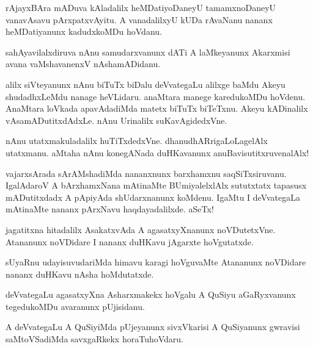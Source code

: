 \begin{mng}
rAjayxBAra mADuva kAladalilx heMDatiyoDaneyU tamamxnoDaneyU vanavAsavu pArxpatxvAyitu. A vanadalilxyU kUDa rAvaNanu nananx heMDatiyanunx kadudxkoMDu hoVdanu.
\end{mng}

\begin{mng}
sahAyavilalxdiruva nAnu samudarxvanunx dATi A laMkeyanunx Akarxmisi avana vaMshavanenxV nAshamADidanu.
\end{mng}

\begin{mng}
alilx siVteyanunx nAnu biTuTx biDalu deVvategaLu alilxge baMdu Akeyu shudadhxLeMdu nanage heVLidaru. anaMtara manege karedukoMDu hoVdenu. AnaMtara loVkada apavAdadiMda matetx biTuTx biTeTxnu. Akeyu kADinalilx vAsamADutitxdAdxLe. nAnu Urinalilx suKavAgidedxVne.
\end{mng}

\begin{mng}
nAnu utatxmakuladalilx huTiTxdedxVne. dhanudhARrigaLoLagelAlx utatxmanu. aMtaha nAnu konegANada duHKavanunx anuBavisutitxruvenalAlx!
\end{mng}

\begin{mng}
vajarxsArada sArAMshadiMda nananxnunx barxhamxnu saqSiTxsiruvanu. IgalAdaroV A bArxhamxNana mAtinaMte BUmiyalelxlAlx sututxtatx tapasusx mADutitxdadx A pApiyAda shUdarxnanunx koMdenu. IgaMtu I deVvategaLa mAtinaMte nananx pArxNavu haqdayadalilxde. aSeTx!
\end{mng}

\begin{mng}
jagatitxna hitadalilx AsakatxvAda A agasatxyXnanunx noVDutetxVne. Atananunx noVDidare I nananx duHKavu jAgarxte hoVgutatxde.
\end{mng}

\begin{mng}
sUyaRnu udayisuvudariMda himavu karagi hoVguvaMte Atananunx noVDidare nananx duHKavu nAsha hoMdutatxde.
\end{mng}

\begin{mng}
deVvategaLu agasatxyXna Asharxmakekx hoVgalu A QuSiyu aGaRyxvanunx tegedukoMDu avaranunx pUjisidanu.
\end{mng}

\begin{mng}
A deVvategaLu A QuSiyiMda pUjeyanunx sivxVkarisi A QuSiyanunx gwravisi saMtoVSadiMda savxgaRkekx horaTuhoVdaru.
\end{mng}

